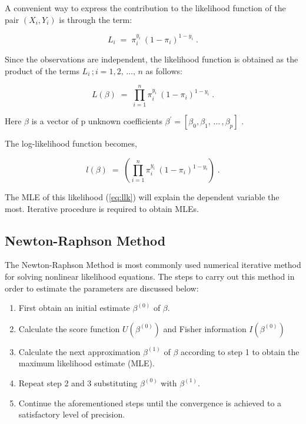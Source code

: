\documentclass[
  12pt,
  oneside]{report}
\providecommand{\tightlist}{%
  \setlength{\itemsep}{0pt}\setlength{\parskip}{0pt}}
\begin{document}
A convenient way to express the contribution to the likelihood function of the pair
\((X_i, Y_i)\) is through the term:

\begin{equation*}
L_i \; = \; \pi_i^{y_i} \: (1-\pi_i)^{1-y_i} \; .
\end{equation*}

Since the observations are independent, the likelihood function is obtained as the
product of the terms \(L_i \,; i = 1, 2, \, \dots, \, n\) as follows:

\begin{equation*}
L(\beta) \; = \; \prod_{i=1}^{n} \pi_i^{y_i} \: (1-\pi_i)^{1-y_i} \; .
\end{equation*}

Here \(\beta\) is a vector of p unknown coefficients \(\beta^\prime = [\beta_0, \beta_1, \, \dots \, ,\beta_p]\) .

The log-likelihood function becomes,

\begin{equation}
l(\beta) \; = \; \left(\prod_{i=1}^{n} \pi_i^{y_i} \: (1-\pi_i)^{1-y_i}\right) \; .
\label{eq:llk}
\end{equation}

The MLE of this likelihood (\eqref{eq:llk}) will explain the dependent variable the most. Iterative procedure is required to obtain MLEs.

\hypertarget{newton-raphson-method}{%
\subsection{Newton-Raphson Method}\label{newton-raphson-method}}

The Newton-Raphson Method is most commonly used numerical iterative method for solving nonlinear likelihood equations. The steps to carry out this method in order to estimate the parameters are discussed below:

\begin{enumerate}
\def\labelenumi{\arabic{enumi}.}
\tightlist
\item
  First obtain an initial estimate \(\beta^{(0)}\) of \(\beta\).
\item
  Calculate the score function \(U(\beta^{(0)})\) and Fisher information \(I(\beta^{(0)})\)
\item
  Calculate the next approximation \(\beta^{(1)}\) of \(\beta\) according to step 1 to obtain the maximum likelihood estimate (MLE).
\item
  Repeat step 2 and 3 substituting \(\beta^{(0)}\) with \(\beta^{(1)}\).
\item
  Continue the aforementioned steps until the convergence is achieved to a
  satisfactory level of precision.
\end{enumerate}
\end{document}
